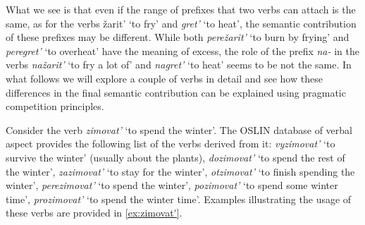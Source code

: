 What we see is that even if the range of prefixes that two verbs can attach is the same, as for the verbs \v{z}arit' `to fry' and \textit{gret'} `to heat', the semantic contribution of these prefixes may be different. While both \textit{pere\v{z}arit'} `to burn by frying' and \textit{peregret'} `to overheat' have the meaning of excess, the role of the prefix \textit{na-} in the verbs \textit{na\v{z}arit'} `to fry a lot of' and \textit{nagret'} `to heat' seems to be not the same. In what follows we will explore a couple of verbs in detail and see how these differences in the final semantic contribution can be explained using pragmatic competition principles.

Consider the verb \textit{zimovat'} `to spend the winter'. The OSLIN database of verbal aspect provides the following list of the verbs derived from it: \textit{vyzimovat'} `to survive the winter' (usually about the plants), \textit{dozimovat'} `to spend the rest of the winter', \textit{zazimovat'} `to stay for the winter', \textit{otzimovat'} `to finish spending the winter', \textit{perezimovat'} `to spend the winter', \textit{pozimovat'} `to spend some winter time', \textit{prozimovat'} `to spend the winter time'. Examples illustrating the usage of these verbs are provided in \ref{ex:zimovat'}.

